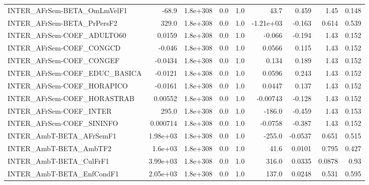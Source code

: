 \begin{tabular}{lrrrrrrrr}
INTER\_AFrSem-BETA\_OmLmVelF1           &       -68.9 &     1.8e+308 &     0.0 &      1.0 &       43.7 &       0.459 &         1.45 &         0.148 \\
INTER\_AFrSem-BETA\_PrPersF2            &       329.0 &     1.8e+308 &     0.0 &      1.0 &  -1.21e+03 &      -0.163 &        0.614 &         0.539 \\
INTER\_AFrSem-COEF\_ADULTO60            &      0.0159 &     1.8e+308 &     0.0 &      1.0 &     -0.066 &      -0.194 &         1.43 &         0.152 \\
INTER\_AFrSem-COEF\_CONGCD              &      -0.046 &     1.8e+308 &     0.0 &      1.0 &     0.0566 &       0.115 &         1.43 &         0.152 \\
INTER\_AFrSem-COEF\_CONGEF              &     -0.0434 &     1.8e+308 &     0.0 &      1.0 &      0.134 &       0.189 &         1.43 &         0.152 \\
INTER\_AFrSem-COEF\_EDUC\_BASICA         &     -0.0121 &     1.8e+308 &     0.0 &      1.0 &     0.0596 &       0.243 &         1.43 &         0.152 \\
INTER\_AFrSem-COEF\_HORAPICO            &     -0.0161 &     1.8e+308 &     0.0 &      1.0 &     0.0447 &       0.137 &         1.43 &         0.152 \\
INTER\_AFrSem-COEF\_HORASTRAB           &     0.00552 &     1.8e+308 &     0.0 &      1.0 &   -0.00743 &      -0.128 &         1.43 &         0.152 \\
INTER\_AFrSem-COEF\_INTER               &       295.0 &     1.8e+308 &     0.0 &      1.0 &     -186.0 &      -0.459 &         1.43 &         0.153 \\
INTER\_AFrSem-COEF\_SININFO             &    0.000714 &     1.8e+308 &     0.0 &      1.0 &    -0.0758 &      -0.387 &         1.43 &         0.152 \\
INTER\_AmbT-BETA\_AFrSemF1              &    1.98e+03 &     1.8e+308 &     0.0 &      1.0 &     -255.0 &     -0.0537 &        0.651 &         0.515 \\
INTER\_AmbT-BETA\_AmbTF2                &     1.6e+03 &     1.8e+308 &     0.0 &      1.0 &       41.6 &      0.0101 &        0.795 &         0.427 \\
INTER\_AmbT-BETA\_CulFrF1               &    3.99e+03 &     1.8e+308 &     0.0 &      1.0 &      316.0 &      0.0335 &       0.0878 &          0.93 \\
INTER\_AmbT-BETA\_EnfCondF1             &    2.05e+03 &     1.8e+308 &     0.0 &      1.0 &      137.0 &      0.0248 &        0.531 &         0.595 \\

\end{tabular}
